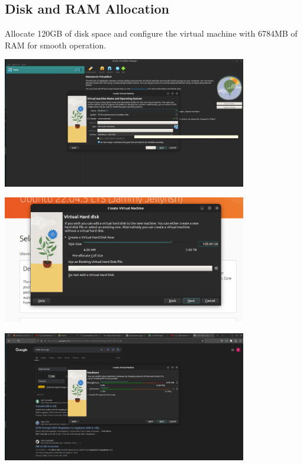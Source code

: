 \documentclass[a4paper]{article}
\begin{document}
\subsection{Disk and RAM Allocation}
Allocate 120GB of disk space and configure the virtual machine with 6784MB of RAM for smooth operation.

\begin{center}
    \includegraphics[width=0.8\textwidth]{2.jpeg} %
\end{center}
\begin{center}
    \includegraphics[width=0.8\textwidth]{3.jpeg} %
\end{center}
\begin{center}
    \includegraphics[width=0.8\textwidth]{4.jpeg} %
\end{center}
\end{document}
